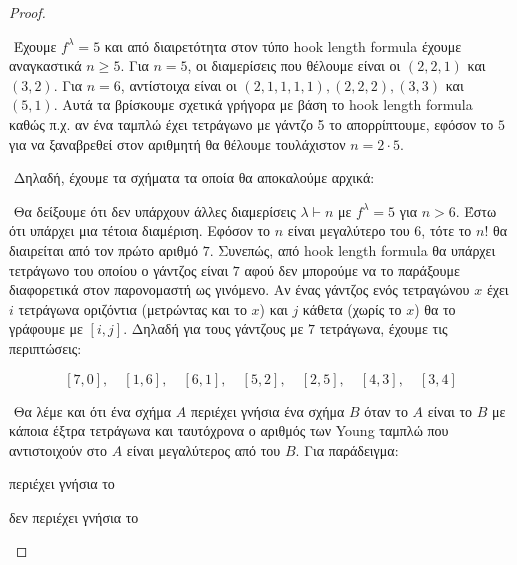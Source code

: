 \documentclass[oneside,a4paper]{article}
\newcommand {\tl}{\textlatin}
\begin{document}
\vspace*{1cm}
\begin{proof} $ $
    
    $ $\newline
    Έχουμε $f^{\lambda} = 5$ και από διαιρετότητα στον τύπο \tl{hook length formula} έχουμε αναγκαστικά $n\geq 5$. Για $n=5$, οι διαμερίσεις που θέλουμε είναι οι $(2,2,1)$ και $(3,2)$. Για $n=6$, αντίστοιχα είναι οι $(2,1,1,1,1),(2,2,2),(3,3)$ και $(5,1)$. Αυτά τα βρίσκουμε σχετικά γρήγορα με βάση το \tl{hook length formula} καθώς π.χ. αν ένα ταμπλώ έχει τετράγωνο με γάντζο 5 το απορρίπτουμε, εφόσον το $5$ για να ξαναβρεθεί στον αριθμητή θα θέλουμε τουλάχιστον $n=2\cdot 5$.

    $ $\newline
    Δηλαδή, έχουμε τα σχήματα τα οποία θα αποκαλούμε αρχικά:

    \vspace*{1cm}\begin{center}
     \quad  {} \quad {} \quad {} \quad {} \quad {}
    \end{center}

    $ $\newline
    Θα δείξουμε ότι δεν υπάρχουν άλλες διαμερίσεις $\lambda \vdash n$ με $f^{\lambda}=5$ για $n>6$. Έστω ότι υπάρχει μια τέτοια διαμέριση. Εφόσον το $n$ είναι μεγαλύτερο του $6$, τότε το $n!$ θα διαιρείται από τον πρώτο αριθμό $7$. Συνεπώς, από \tl{hook length formula} θα υπάρχει τετράγωνο του οποίου ο γάντζος είναι $7$ αφού δεν μπορούμε να το παράξουμε διαφορετικά στον παρονομαστή ως γινόμενο. Αν ένας γάντζος ενός τετραγώνου $x$ έχει $i$ τετράγωνα οριζόντια (μετρώντας και το $x$) και $j$ κάθετα (χωρίς το $x$) θα το γράφουμε με $[i,j]$. Δηλαδή για τους γάντζους με $7$ τετράγωνα, έχουμε τις περιπτώσεις:

    $$[7,0], \quad [1,6],  \quad [6,1],  \quad [5,2],  \quad [2,5],  \quad [4,3],  \quad [3,4]$$

    $ $\newline
    Θα λέμε και ότι ένα σχήμα $A$ περιέχει γνήσια ένα σχήμα $B$ όταν το $A$ είναι το $B$ με κάποια έξτρα τετράγωνα και ταυτόχρονα ο αριθμός των \tl{Young} ταμπλώ που αντιστοιχούν στο $A$ είναι μεγαλύτερος από του $B$. Για παράδειγμα:
    
    \vspace*{0.5cm}
    \begin{center} \quad περιέχει γνήσια το \quad {}\end{center}
    \begin{center}  \quad δεν περιέχει γνήσια το \quad {} \end{center}


\end{proof}
\end{document}
